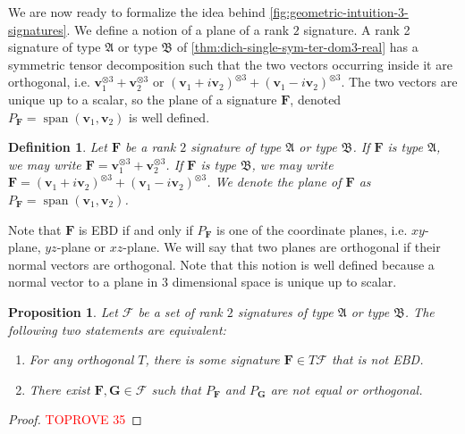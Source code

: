 \documentclass[11pt]{article}
\newtheorem{definition}[theorem]{Definition}
\newtheorem{proposition}[theorem]{Proposition}
\DeclareMathOperator{\spn}{span}
\newcommand{\teh}{^{\otimes 3}}
\newcommand{\strspt}{\textsf{EBD}\xspace}
\newcommand{\ternarytractgeneq}{$\mathfrak{A}$\xspace}
\newcommand{\ternarytractz}{$\mathfrak{B}$\xspace}
\begin{document}
We are now ready to formalize the idea behind \cref{fig:geometric-intuition-3-signatures}. 
We define a notion of a plane of a rank $2$ signature.
A rank 2 signature of type \ternarytractgeneq or type \ternarytractz of \cref{thm:dich-single-sym-ter-dom3-real} has a symmetric tensor decomposition such that the two vectors occurring inside it are orthogonal, i.e. $\mathbf{v}_1\teh + \mathbf{v}_2\teh$ or $(\mathbf{v}_1 + i \mathbf{v}_2)\teh + (\mathbf{v}_1 - i \mathbf{v}_2)\teh$.
The two vectors are unique up to a scalar, so the plane of a signature $\mathbf{F}$, denoted $P_{\mathbf{F}} = \spn(\mathbf{v}_1, \mathbf{v}_2)$ is well defined.
\begin{definition}
  Let $\mathbf{F}$ be a rank $2$ signature of type \ternarytractgeneq or type \ternarytractz.
  If $\mathbf{F}$ is type \ternarytractgeneq, we may write $\mathbf{F} = \mathbf{v}_1\teh + \mathbf{v}_2\teh$.
  If $\mathbf{F}$ is type \ternarytractz, we may write $\mathbf{F} = (\mathbf{v}_1 + i \mathbf{v}_2)\teh + (\mathbf{v}_1 - i \mathbf{v}_2)\teh$.
  We denote the plane of $\mathbf{F}$ as $P_{\mathbf{F}} = \spn(\mathbf{v}_1, \mathbf{v}_2)$.
\end{definition}
Note that $\mathbf{F}$ is \strspt if and only if $P_{\mathbf{F}}$ is one of the coordinate planes, i.e. $xy$-plane, $yz$-plane or $xz$-plane.
We will say that two planes are orthogonal if their normal vectors are orthogonal.
Note that this notion is well defined because a normal vector to a plane in $3$ dimensional space is unique up to scalar.

\begin{proposition}\label{prop:cannot-strspt-plane}
  Let $\mathcal{F}$ be a set of rank $2$ signatures of type \ternarytractgeneq or type \ternarytractz.
  The following two statements are equivalent:
  \begin{enumerate}
    \item For any orthogonal $T$, there is some signature $\mathbf{F} \in T \mathcal{F}$ that is not \strspt.
    \item There exist $\mathbf{F}, \mathbf{G} \in \mathcal{F}$ such that $P_{\mathbf{F}}$ and $P_{\mathbf{G}}$ are not equal or orthogonal.
  \end{enumerate}
\end{proposition}
\begin{proof}\textcolor{red}{TOPROVE 35}\end{proof}
\end{document}
